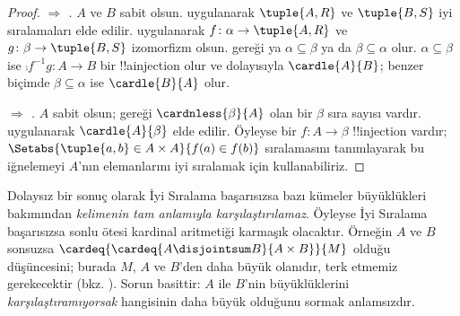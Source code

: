 \documentclass[../../../include/open-logic-section]{subfiles}
\begin{document}
\begin{proof}
\emph{ $\Rightarrow$ .} $A$ ve $B$
sabit olsun.  uygulanarak $\tuple{A,R}$ ve
$\tuple{B,S}$ iyi sıralamaları elde edilir.
 uygulanarak
$f\colon\alpha\to\tuple{A,R}$ ve
$g\colon\beta\to\tuple{B,S}$ izomorfizm olsun.
 gereği ya
$\alpha\subseteq\beta$ ya da $\beta\subseteq\alpha$ olur.
$\alpha\subseteq\beta$ ise
$\comp{f^{-1}}{g}\colon A\to B$ bir !!a{injection} olur ve dolayısıyla
$\cardle{A}{B}$; benzer biçimde $\beta\subseteq\alpha$ ise
$\cardle{B}{A}$ olur.

\emph{ $\Rightarrow$ .} $A$ sabit
olsun;  gereği $\cardnless{\beta}{A}$ olan bir
$\beta$ sıra sayısı vardır.  uygulanarak
$\cardle{A}{\beta}$ elde edilir. Öyleyse bir $f\colon A\to\beta$
!!{injection} vardır; $\Setabs{\tuple{a,b}\in A\times A}{f(a)\in f(b)}$
sıralamasını tanımlayarak bu iğnelemeyi $A$'nın elemanlarını iyi sıralamak
için kullanabiliriz.
\end{proof}
\noindent
Dolaysız bir sonuç olarak İyi Sıralama başarısızsa bazı kümeler
büyüklükleri bakımından \emph{kelimenin tam anlamıyla karşılaştırılamaz}.
Öyleyse İyi Sıralama başarısızsa sonlu ötesi kardinal aritmetiği karmaşık
olacaktır. Örneğin $A$ ve $B$ sonsuzsa
$\cardeq{\cardeq{A \disjointsum B}{A \times B}}{M}$ olduğu düşüncesini;
burada $M$, $A$ ve $B$'den daha büyük olanıdır, terk etmemiz gerekecektir
(bkz. ). Sorun basittir:
$A$ ile $B$'nin büyüklüklerini \emph{karşılaştıramıyorsak} hangisinin daha
büyük olduğunu sormak anlamsızdır.
\end{document}

